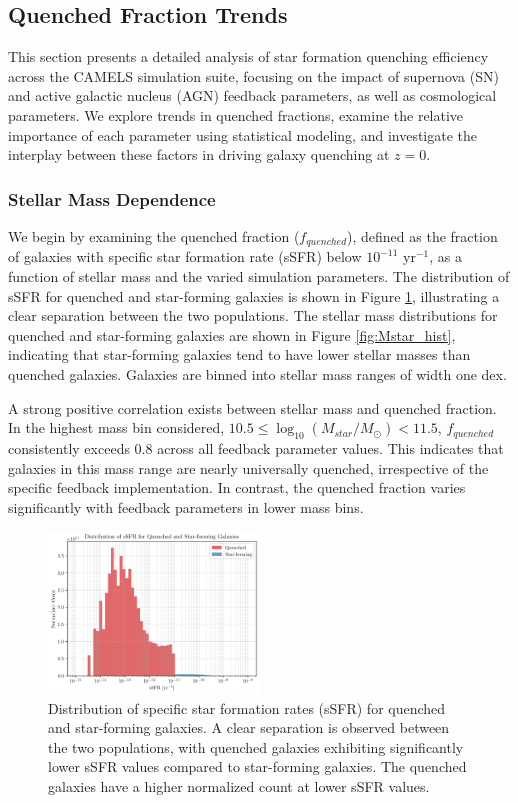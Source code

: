 \documentclass[twocolumn]{aastex631}
\begin{document}
\subsection{Quenched Fraction Trends}

This section presents a detailed analysis of star formation quenching efficiency across the CAMELS simulation suite, focusing on the impact of supernova (SN) and active galactic nucleus (AGN) feedback parameters, as well as cosmological parameters. We explore trends in quenched fractions, examine the relative importance of each parameter using statistical modeling, and investigate the interplay between these factors in driving galaxy quenching at \(z=0\).

\subsubsection{Stellar Mass Dependence}

We begin by examining the quenched fraction (\(f_{quenched}\)), defined as the fraction of galaxies with specific star formation rate (sSFR) below \(10^{-11} \text{ yr}^{-1}\), as a function of stellar mass and the varied simulation parameters. The distribution of sSFR for quenched and star-forming galaxies is shown in Figure \ref{fig:sSFR_hist}, illustrating a clear separation between the two populations. The stellar mass distributions for quenched and star-forming galaxies are shown in Figure \ref{fig:Mstar_hist}, indicating that star-forming galaxies tend to have lower stellar masses than quenched galaxies. Galaxies are binned into stellar mass ranges of width one dex.

A strong positive correlation exists between stellar mass and quenched fraction. In the highest mass bin considered, \(10.5 \leq \log_{10}(M_{star}/M_\odot) < 11.5\), \(f_{quenched}\) consistently exceeds 0.8 across all feedback parameter values. This indicates that galaxies in this mass range are nearly universally quenched, irrespective of the specific feedback implementation. In contrast, the quenched fraction varies significantly with feedback parameters in lower mass bins.

\begin{figure}[h!]
    \centering
    \includegraphics[width=0.5\textwidth]{../Project6/plots/sSFR_histogram_1_20250424_133143.png}
    \caption{\label{fig:sSFR_hist} Distribution of specific star formation rates (sSFR) for quenched and star-forming galaxies. A clear separation is observed between the two populations, with quenched galaxies exhibiting significantly lower sSFR values compared to star-forming galaxies. The quenched galaxies have a higher normalized count at lower sSFR values.
}
\end{figure}
\end{document}
